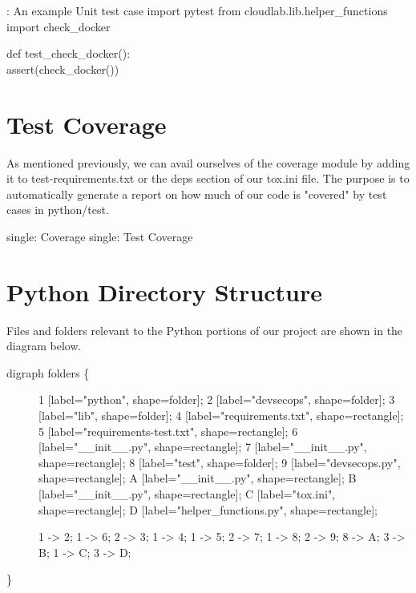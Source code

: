 \begin{mybox}{\thetcbcounter: An example Unit test case}
import pytest
from cloudlab.lib.helper\_functions import check\_docker


def test\_check\_docker():\\
   assert(check\_docker())\\
\end{mybox}

\hypertarget{test-coverage}{%
\section{Test Coverage}\label{test-coverage}}

As mentioned previously, we can avail ourselves of the coverage module
by adding it to test-requirements.txt or the deps section of our tox.ini
file. The purpose is to automatically generate a report on how much of
our code is "covered" by test cases in python/test.

single: Coverage single: Test Coverage

\section{Python Directory Structure}

Files and folders relevant to the Python portions of our project are
shown in the diagram below.

\begin{description}
\item[digraph folders \{]
1 {[}label="python", shape=folder{]}; 2 {[}label="devsecops",
shape=folder{]}; 3 {[}label="lib", shape=folder{]}; 4
{[}label="requirements.txt", shape=rectangle{]}; 5
{[}label="requirements-test.txt", shape=rectangle{]}; 6
{[}label="\_\_init\_\_.py", shape=rectangle{]}; 7
{[}label="\_\_init\_\_.py", shape=rectangle{]}; 8 {[}label="test",
shape=folder{]}; 9 {[}label="devsecops.py", shape=rectangle{]}; A
{[}label="\_\_init\_\_.py", shape=rectangle{]}; B
{[}label="\_\_init\_\_.py", shape=rectangle{]}; C {[}label="tox.ini",
shape=rectangle{]}; D {[}label="helper\_functions.py",
shape=rectangle{]};

1 -\textgreater{} 2; 1 -\textgreater{} 6; 2 -\textgreater{} 3; 1
-\textgreater{} 4; 1 -\textgreater{} 5; 2 -\textgreater{} 7; 1
-\textgreater{} 8; 2 -\textgreater{} 9; 8 -\textgreater{} A; 3
-\textgreater{} B; 1 -\textgreater{} C; 3 -\textgreater{} D;
\end{description}

\}
